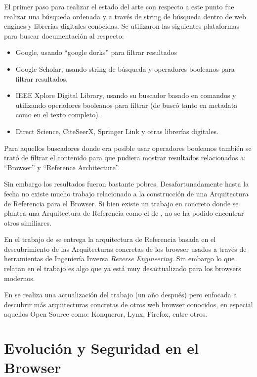 El primer paso para realizar el estado del arte con respecto a este punto fue realizar una búsqueda ordenada y a través de string de búsqueda dentro de web engines y librerías digitales conocidas. Se utilizaron las siguientes plataformas para buscar documentación al respecto:
\begin{itemize}
    \item Google, usando ``google dorks'' para filtrar resultados
    \item Google Scholar, usando string de búsqueda y operadores booleanos para filtrar resultados.
    \item IEEE Xplore Digital Library, usando su buscador basado en comandos y utilizando operadores booleanos para filtrar (de buscó tanto en metadata como en el texto completo).
    \item Direct Science, CiteSeerX, Springer Link y otras librerías digitales. 
\end{itemize}

Para aquellos buscadores donde era posible usar operadores booleanos también se trató de filtrar el contenido para que pudiera mostrar resultados relacionados a: ``Browser'' y ``Reference Architecture''.

Sin embargo los resultados fueron bastante pobres. Desafortunadamente hasta la fecha no existe mucho trabajo relacionado a la construcción de una Arquitectura de Referencia para el Browser. Si bien existe un trabajo en concreto donde se plantea una Arquitectura de Referencia como el de \cite{2005-grosskurth-browser-refarch}, no se ha podido encontrar otros similiares. 


En el trabajo de \cite{2005-grosskurth-browser-refarch} se entrega la arquitectura de Referencia basada en el descubrimiento de las Arquitecturas concretas de los browser usados a través de herramientas de Ingeniería Inversa \textit{Reverse Engineering}. Sin embargo lo que relatan en el trabajo es algo que ya está muy desactualizado para los browsers modernos. 

En \cite{preprint-grosskurth-browser-archevol} se realiza una actualización del trabajo (un año después) pero enfocada a descubrir más arquitecturas concretas de otros web browser conocidos, en especial aquellos Open Source como: Konqueror, Lynx, Firefox, entre otros.


\section{Evolución y Seguridad en el Browser}
\label{chap3:EvoandSec}

